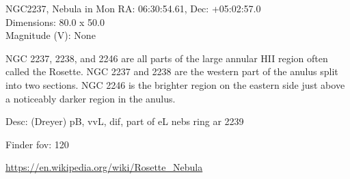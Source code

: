 \begin{block}{NGC2237, Nebula in Mon}
    RA: 06:30:54.61, Dec: +05:02:57.0 \\ 
    Dimensions: 80.0 x 50.0 \\ 
    Magnitude (V): None

    NGC 2237, 2238, and 2246 are all parts of the large annular HII region
    often called the Rosette. NGC 2237 and 2238 are the western part of the
    anulus split into two sections. NGC 2246 is the brighter region on the
    eastern side just above a noticeably darker region in the anulus.

    Desc: (Dreyer) pB, vvL, dif, part of eL nebs ring ar 2239 

    Finder fov: 120 

    \url{https://en.wikipedia.org/wiki/Rosette_Nebula} 
\end{block}
